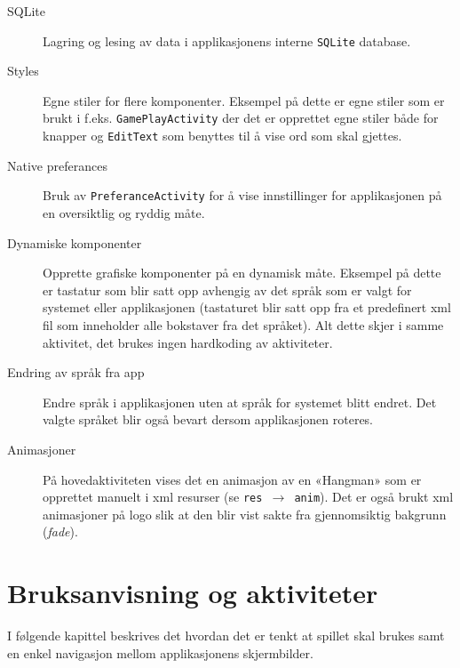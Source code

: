 \begin{description}

\item[SQLite] Lagring og lesing av data i applikasjonens interne \texttt{SQLite} database.

\item[Styles] Egne stiler for flere komponenter. Eksempel på dette er egne stiler som er brukt i f.eks. \texttt{GamePlayActivity} der det er opprettet egne stiler både for knapper og \texttt{EditText} som benyttes til å vise ord som skal gjettes.

\item[Native preferances] Bruk av \texttt{PreferanceActivity} for å vise innstillinger for applikasjonen på en oversiktlig og ryddig måte. 

\item[Dynamiske komponenter] Opprette grafiske komponenter på en dynamisk måte. Eksempel på dette er tastatur som blir satt opp avhengig av det språk som er valgt for systemet eller applikasjonen (tastaturet blir satt opp fra et predefinert xml fil som inneholder alle bokstaver fra det språket). Alt dette skjer i samme aktivitet, det brukes ingen hardkoding av aktiviteter.

\item[Endring av språk fra app] Endre språk i applikasjonen uten at språk for systemet blitt endret. Det valgte språket blir også bevart dersom applikasjonen roteres. 

\item[Animasjoner] På hovedaktiviteten vises det en animasjon av en «Hangman» som er opprettet manuelt i xml resurser (se \texttt{res $\rightarrow$ anim}). Det er også brukt xml animasjoner på logo slik at den blir vist sakte fra gjennomsiktig bakgrunn (\textit{fade}).

\end{description}



\chapter{Bruksanvisning og aktiviteter}
I følgende kapittel beskrives det hvordan det er tenkt at spillet skal brukes samt en enkel navigasjon mellom applikasjonens skjermbilder. 

